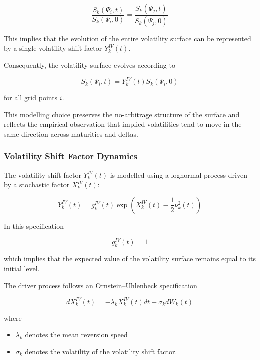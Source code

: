 \begin{equation}
	\frac{S_k(\Psi_i,t)}{S_k(\Psi_i,0)} =
	\frac{S_k(\Psi_j,t)}{S_k(\Psi_j,0)}
\end{equation}

This implies that the evolution of the entire volatility surface can be represented by a single volatility shift factor $Y_k^{IV}(t)$.

Consequently, the volatility surface evolves according to

\begin{equation}
	S_k(\Psi_i,t) = Y_k^{IV}(t)S_k(\Psi_i,0)
\end{equation}

for all grid points $i$.

This modelling choice preserves the no-arbitrage structure of the surface and reflects the empirical observation that implied volatilities tend to move in the same direction across maturities and deltas.

\subsubsection{Volatility Shift Factor Dynamics}

The volatility shift factor $Y_k^{IV}(t)$ is modelled using a lognormal process driven by a stochastic factor $X_k^{IV}(t)$:

\begin{equation}
	Y_k^{IV}(t) =
	g_k^{IV}(t)\exp\left(X_k^{IV}(t) - \frac{1}{2}\nu_k^2(t)\right)
\end{equation}

In this specification

\begin{equation}
	g_k^{IV}(t) = 1
\end{equation}

which implies that the expected value of the volatility surface remains equal to its initial level.

The driver process follows an Ornstein--Uhlenbeck specification

\begin{equation}
	dX_k^{IV}(t) = -\lambda_k X_k^{IV}(t)dt + \sigma_k dW_k(t)
\end{equation}

where

\begin{itemize}
	\item $\lambda_k$ denotes the mean reversion speed
	\item $\sigma_k$ denotes the volatility of the volatility shift factor.
\end{itemize}

